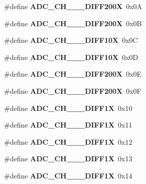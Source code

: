 \begin{CompactItemize}
\item 
\hypertarget{group__a2d_gb9f0b92dd2b67505c26233ada7205e3b}{
\#define \textbf{ADC\_\-CH\_\_\_\-DIFF200X}~0x0A}
\label{group__a2d_gb9f0b92dd2b67505c26233ada7205e3b}

\item 
\hypertarget{group__a2d_gb31f08e45996680fef63c8e4c9125f5d}{
\#define \textbf{ADC\_\-CH\_\_\_\-DIFF200X}~0x0B}
\label{group__a2d_gb31f08e45996680fef63c8e4c9125f5d}

\item 
\hypertarget{group__a2d_g03b2bd74b75fd0a659a927aad76002de}{
\#define \textbf{ADC\_\-CH\_\_\_\-DIFF10X}~0x0C}
\label{group__a2d_g03b2bd74b75fd0a659a927aad76002de}

\item 
\hypertarget{group__a2d_gf70e34012606f8a3d0e8afd3507c6fcb}{
\#define \textbf{ADC\_\-CH\_\_\_\-DIFF10X}~0x0D}
\label{group__a2d_gf70e34012606f8a3d0e8afd3507c6fcb}

\item 
\hypertarget{group__a2d_ga2678f0cab37f1a9c526679363460962}{
\#define \textbf{ADC\_\-CH\_\_\_\-DIFF200X}~0x0E}
\label{group__a2d_ga2678f0cab37f1a9c526679363460962}

\item 
\hypertarget{group__a2d_g8c54c7176365604c459ab8a06231d909}{
\#define \textbf{ADC\_\-CH\_\_\_\-DIFF200X}~0x0F}
\label{group__a2d_g8c54c7176365604c459ab8a06231d909}

\item 
\hypertarget{group__a2d_g1f7378bc96b9faff43a7b2c5639405c1}{
\#define \textbf{ADC\_\-CH\_\_\_\-DIFF1X}~0x10}
\label{group__a2d_g1f7378bc96b9faff43a7b2c5639405c1}

\item 
\hypertarget{group__a2d_gb08fb3b8335d0134639b7cd37def4b48}{
\#define \textbf{ADC\_\-CH\_\_\_\-DIFF1X}~0x11}
\label{group__a2d_gb08fb3b8335d0134639b7cd37def4b48}

\item 
\hypertarget{group__a2d_g9e466f0a78d4a76e060254fc2a9dae77}{
\#define \textbf{ADC\_\-CH\_\_\_\-DIFF1X}~0x12}
\label{group__a2d_g9e466f0a78d4a76e060254fc2a9dae77}

\item 
\hypertarget{group__a2d_g5ca820abd164971170288e59fa41e2d9}{
\#define \textbf{ADC\_\-CH\_\_\_\-DIFF1X}~0x13}
\label{group__a2d_g5ca820abd164971170288e59fa41e2d9}

\item 
\hypertarget{group__a2d_g9faea1861eb2bc2d916eb9fbfddeef38}{
\#define \textbf{ADC\_\-CH\_\_\_\-DIFF1X}~0x14}
\label{group__a2d_g9faea1861eb2bc2d916eb9fbfddeef38}


\end{CompactItemize}
